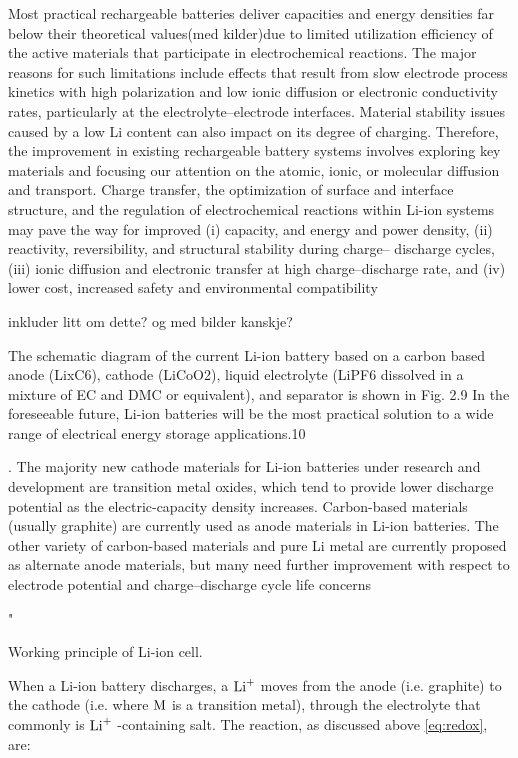 Most practical
rechargeable batteries deliver capacities and energy densities
far below their theoretical values(med kilder)due to limited utilization
efficiency of the active materials that participate in electrochemical reactions. The major reasons for such limitations
include effects that result from slow electrode process kinetics
with high polarization and low ionic diffusion or electronic
conductivity rates, particularly at the electrolyte–electrode interfaces. Material stability issues caused by a low Li content can
also impact on its degree of charging. Therefore, the improvement
in existing rechargeable battery systems involves exploring key
materials and focusing our attention on the atomic, ionic, or
molecular diffusion and transport. Charge transfer, the optimization of surface and interface structure, and the regulation of
electrochemical reactions within Li-ion systems may pave the
way for improved (i) capacity, and energy and power density,
(ii) reactivity, reversibility, and structural stability during charge–
discharge cycles, (iii) ionic diffusion and electronic transfer at
high charge–discharge rate, and (iv) lower cost, increased safety
and environmental compatibility


inkluder litt om dette? og med bilder kanskje?

The schematic diagram of the current Li-ion battery based on
a carbon based anode (LixC6), cathode (LiCoO2), liquid electrolyte (LiPF6 dissolved in a mixture of EC and DMC or equivalent),
and separator is shown in Fig. 2.9 In the foreseeable future,
Li-ion batteries will be the most practical solution to a wide
range of electrical energy storage applications.10


. The majority new cathode
materials for Li-ion batteries under research and development
are transition metal oxides, which tend to provide lower discharge
potential as the electric-capacity density increases. Carbon-based
materials (usually graphite) are currently used as anode materials
in Li-ion batteries. The other variety of carbon-based materials and
pure Li metal are currently proposed as alternate anode materials,
but many need further improvement with respect to electrode
potential and charge–discharge cycle life concerns

"\cite{bhatt2015recent}

Working principle of Li-ion cell. 

When a Li-ion battery discharges, a $\ce{Li^+}$ moves from the anode (i.e. graphite) to the cathode (i.e.  where $\ce{M}$ is a transition metal), through the electrolyte that commonly is  $\ce{Li^+}$ -containing salt. The reaction, as discussed above \ref{eq:redox}, are:


